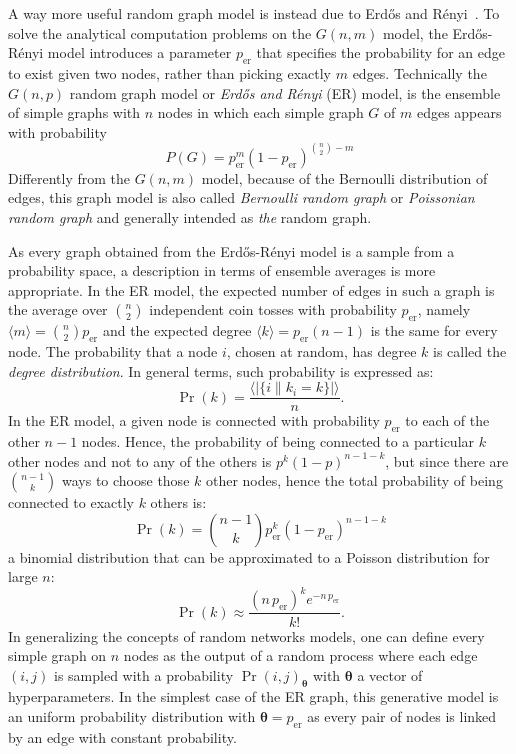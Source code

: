 \documentclass[11pt,              a4paper,              twoside,openright,              titlepage,              headinclude,footinclude,                            numbers=noenddot,              cleardoublepage=empty,]{scrreprt}
\begin{document}
A way more useful random graph model is instead due to Erd\H{o}s and Rényi~\cite{erdos1959}.
To solve the analytical computation problems on the $G(n,m)$ model, the Erd\H{o}s-Rényi model introduces a parameter $p_{\textrm{er}}$ that specifies the probability for an edge to exist given two nodes, rather than picking exactly $m$ edges.
Technically the $G(n,p)$ random graph model or \emph{Erd\H{o}s and Rényi} (ER) model, is the ensemble of simple graphs with $n$ nodes in which each simple graph $G$ of $m$ edges appears with probability
\begin{equation}
P(G)={p}_{\textrm{er}}^{m}(1-p_{\textrm{er}})^{\binom{n}{2}-m}
\end{equation}
Differently from the $G(n,m)$ model, because of the Bernoulli distribution of edges, this graph model is also called \emph{Bernoulli random graph} or \emph{Poissonian random graph} and generally intended as \emph{the} random graph.

As every graph obtained from the Erd\H{o}s-Rényi model is a sample from a probability space, a description in terms of ensemble averages is more appropriate.
In the ER model, the expected number of edges in such a graph is the average over $\binom{n}{2}$ independent coin tosses with probability $p_{\textrm{er}}$, namely $\langle  m  \rangle = \binom{n}{2}p_{\textrm{er}}$ and the expected degree $\langle  k \rangle = p_{\textrm{er}}(n-1)$ is the same for every node.
The probability that a node $i$, chosen at random, has degree $k$ is called the \emph{degree distribution}.
In general terms, such probability is expressed as:
\begin{equation}
\Pr(k) = \frac{\langle  |\{ i \| k_i=k \}| \rangle }{n}.
\end{equation}
In the ER model, a given node is connected with probability $p_{\textrm{er}}$ to each of the other $n-1$ nodes.
Hence, the probability of being connected to a particular $k$ other nodes and not to any of the others is $p^k(1-p)^{n-1-k}$, but since there are $\binom{n-1}{k}$ ways to choose those $k$ other nodes, hence the total probability of being connected to exactly $k$ others is:
\begin{equation}
\Pr(k) = \binom{n-1}{k}p_{\textrm{er}}^k(1-p_{\textrm{er}})^{n-1-k}
\end{equation}
a binomial distribution that can be approximated to a Poisson distribution for large $n$:
\begin{equation}
\Pr(k) \approx \frac{(n \, p_{\textrm{er}})^k e^{-n \, p_{\textrm{er}}} }{k!}.
\end{equation}
\bigbreak
In generalizing the concepts of random networks models, one can define every simple graph on $n$ nodes as the output of a random process where each edge $(i,j) $ is sampled with a probability $\Pr(i,j)_{ \boldsymbol \theta}$ with $\boldsymbol \theta$ a vector of hyperparameters.
In the simplest case of the ER graph, this generative model is an uniform probability distribution with $\boldsymbol \theta=p_{\textrm{er}}$ as every pair of nodes is linked by an edge with constant probability.
\end{document}
